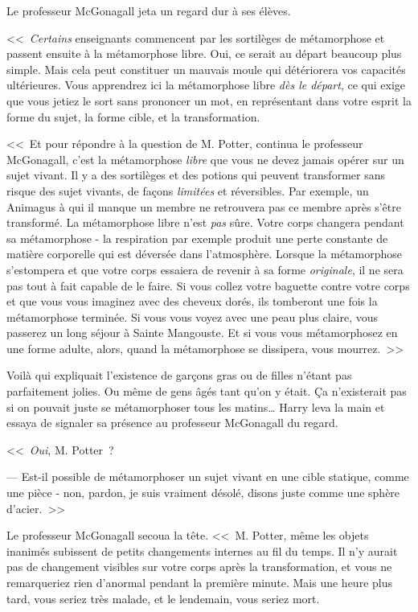 Le professeur McGonagall jeta un regard dur à ses élèves.

<<~\emph{Certains} enseignants commencent par les sortilèges de métamorphose et passent ensuite à la métamorphose libre. Oui, ce serait au départ beaucoup plus simple. Mais cela peut constituer un mauvais moule qui détériorera vos capacités ultérieures. Vous apprendrez ici la métamorphose libre \emph{dès le départ}, ce qui exige que vous jetiez le sort sans prononcer un mot, en représentant dans votre esprit la forme du sujet, la forme cible, et la transformation. %

<<~Et pour répondre à la question de M. Potter, continua le professeur McGonagall, c'est la métamorphose \emph{libre} que vous ne devez jamais opérer sur un sujet vivant. Il y a des sortilèges et des potions qui peuvent transformer sans risque des sujet vivants, de façons \emph{limitées} et réversibles. Par exemple, un Animagus à qui il manque un membre ne retrouvera pas ce membre après s'être transformé. La métamorphose libre n'est \emph{pas} sûre. Votre corps changera pendant sa métamorphose - la respiration par exemple produit une perte constante de matière corporelle qui est déversée dans l'atmosphère. Lorsque la métamorphose s'estompera et que votre corps essaiera de revenir à sa forme \emph{originale}, il ne sera pas tout à fait capable de le faire. Si vous collez votre baguette contre votre corps et que vous vous imaginez avec des cheveux dorés, ils tomberont une fois la métamorphose terminée. Si vous vous voyez avec une peau plus claire, vous passerez un long séjour à Sainte Mangouste. Et si vous vous métamorphosez en une forme adulte, alors, quand la métamorphose se dissipera, vous mourrez.~>>

Voilà qui expliquait l'existence de garçons gras ou de filles n'étant pas parfaitement jolies. Ou même de gens âgés tant qu'on y était. Ça n'existerait pas si on pouvait juste se métamorphoser tous les matins… Harry leva la main et essaya de signaler sa présence au professeur McGonagall du regard.

<<~\emph{Oui}, M. Potter~?

--- Est-il possible de métamorphoser un sujet vivant en une cible statique, comme une pièce - non, pardon, je suis vraiment désolé, disons juste comme une sphère d'acier.~>>

Le professeur McGonagall secoua la tête. <<~M. Potter, même les objets inanimés subissent de petits changements internes au fil du temps. Il n'y aurait pas de changement visibles sur votre corps après la transformation, et vous ne remarqueriez rien d'anormal pendant la première minute. Mais une heure plus tard, vous seriez très malade, et le lendemain, vous seriez mort.

